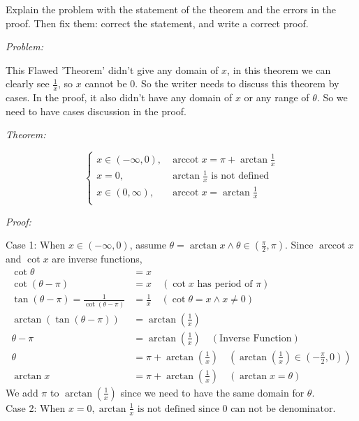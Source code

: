 \documentclass[12pt]{exam}
\newcommand{\vv}{\vspace{.1cm}}
\DeclareMathOperator{\arccot}{arccot}
\begin{document}
\begin{enumerate}
\begin{enumerate}
	Explain the problem with the statement of the theorem and the errors in the proof.  Then fix them: correct the statement, and write a correct proof.
	
	\vv
	
	\emph{Problem:}
	
	\vv
	
	This Flawed 'Theorem' didn't give any domain of $x$, in this theorem we can clearly see $\frac{1}{x}$, so $x$ cannot be 0. So the writer needs to discuss this theorem by cases. In the proof, it also didn't have any domain of $x$ or any range of $\theta.$ So we need to have cases discussion in the proof.
	
	\vv
	
	\emph{Theorem:}
	
	\vv
	$$
	\begin{cases}
	    x\in(-\infty, 0),&\arccot x=\pi+\arctan\frac{1}{x}\\
	    x=0,&\arctan\frac{1}{x} \mbox{ is not defined}\\
	    x\in(0, \infty),&\arccot x=\arctan\frac{1}{x}\\
	\end{cases}
	$$
	\vv
	
	\emph{Proof:}
	
	\vv
	
	Case 1: When $x\in(-\infty, 0)$, assume $\theta=\arctan x \land \theta \in(\frac{\pi}{2},\pi).$ Since $\arccot x$ and $\cot x$ are inverse functions,
	\begin{align*}
	    \cot\theta&=x\\
	    \cot(\theta-\pi)&=x\quad(\cot x\mbox{ has period of }\pi)\\
	    \tan(\theta-\pi)=\frac{1}{\cot(\theta-\pi)}&=\frac{1}{x}\quad(\cot\theta=x\land x\neq0)\\
	    \arctan(\tan(\theta-\pi))&=\arctan(\frac{1}{x})\\
	    \theta-\pi&=\arctan(\frac{1}{x})\quad(\mbox{Inverse Function})\\
	    \theta&=\pi+\arctan(\frac{1}{x})\quad(\arctan(\frac{1}{x})\in(-\frac{\pi}{2},0))\\
	    \arctan x&=\pi+\arctan(\frac{1}{x})\quad(\arctan x=\theta)
	\end{align*}
	We add $\pi$ to $\arctan(\frac{1}{x})$ since we need to have the same domain for $\theta$.\\
	
	Case 2: When $x=0,\arctan\frac{1}{x} \mbox{ is not defined since 0 can not be denominator.}$\\
	

\end{enumerate}
\end{enumerate}
\end{document}
